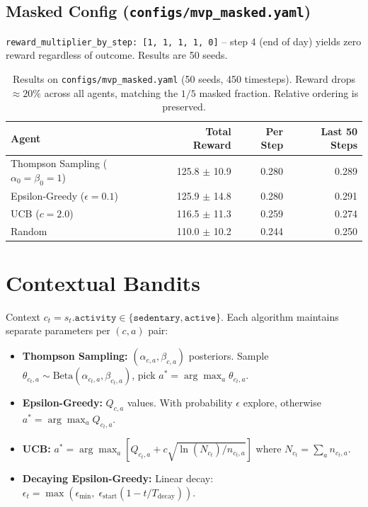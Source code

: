\documentclass[11pt]{article}
\begin{document}
\subsection{Masked Config (\texttt{configs/mvp\_masked.yaml})}
\texttt{reward\_multiplier\_by\_step: [1, 1, 1, 1, 0]} -- step 4 (end of day) yields zero reward regardless of outcome. Results are 50 seeds.

\begin{table}[h]
\centering
\begin{tabular}{lrrr}
\toprule
Agent & Total Reward & Per Step & Last 50 Steps \\
\midrule
Thompson Sampling ($\alpha_0=\beta_0=1$) & 125.8 $\pm$ 10.9 & 0.280 & 0.289 \\
Epsilon-Greedy ($\epsilon=0.1$) & 125.9 $\pm$ 14.8 & 0.280 & 0.291 \\
UCB ($c=2.0$) & 116.5 $\pm$ 11.3 & 0.259 & 0.274 \\
Random & 110.0 $\pm$ 10.2 & 0.244 & 0.250 \\
\bottomrule
\end{tabular}
\caption{Results on \texttt{configs/mvp\_masked.yaml} (50 seeds, 450 timesteps). Reward drops $\approx 20\%$ across all agents, matching the $1/5$ masked fraction. Relative ordering is preserved.}
\end{table}

\section{Contextual Bandits}\label{sec:contextual}

Context $c_t = s_t.\texttt{activity} \in \{\texttt{sedentary}, \texttt{active}\}$. Each algorithm maintains separate parameters per $(c, a)$ pair:

\begin{itemize}
  \item \textbf{Thompson Sampling:} $(\alpha_{c,a}, \beta_{c,a})$ posteriors. Sample $\theta_{c_t, a} \sim \text{Beta}(\alpha_{c_t, a}, \beta_{c_t, a})$, pick $a^* = \arg\max_a \theta_{c_t, a}$.
  \item \textbf{Epsilon-Greedy:} $Q_{c,a}$ values. With probability $\epsilon$ explore, otherwise $a^* = \arg\max_a Q_{c_t, a}$.
  \item \textbf{UCB:} $a^* = \arg\max_a \left[ Q_{c_t, a} + c \sqrt{\ln(N_{c_t}) / n_{c_t, a}} \right]$ where $N_{c_t} = \sum_a n_{c_t, a}$.
  \item \textbf{Decaying Epsilon-Greedy:} Linear decay: $\epsilon_t = \max(\epsilon_{\min},\; \epsilon_{\text{start}} (1 - t / T_{\text{decay}}))$.
\end{itemize}
\end{document}
